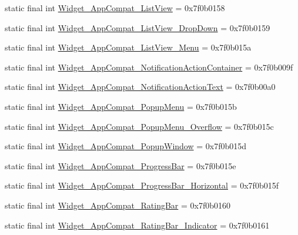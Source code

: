\begin{CompactItemize}
\item 
static final int \hyperlink{classandroid_1_1support_1_1v7_1_1appcompat_1_1_r_1_1style_bc4db4a3feb2a57a38527edc307ebd1e}{Widget\_\-AppCompat\_\-ListView} = 0x7f0b0158
\item 
static final int \hyperlink{classandroid_1_1support_1_1v7_1_1appcompat_1_1_r_1_1style_d32aefb5cb943ba1377d332a2763f876}{Widget\_\-AppCompat\_\-ListView\_\-DropDown} = 0x7f0b0159
\item 
static final int \hyperlink{classandroid_1_1support_1_1v7_1_1appcompat_1_1_r_1_1style_722848f3fc4262932efb8df368153506}{Widget\_\-AppCompat\_\-ListView\_\-Menu} = 0x7f0b015a
\item 
static final int \hyperlink{classandroid_1_1support_1_1v7_1_1appcompat_1_1_r_1_1style_c01243ba782a770cf99e6751ab28245a}{Widget\_\-AppCompat\_\-NotificationActionContainer} = 0x7f0b009f
\item 
static final int \hyperlink{classandroid_1_1support_1_1v7_1_1appcompat_1_1_r_1_1style_2c1a4b4918286c87dc1c2da681631eed}{Widget\_\-AppCompat\_\-NotificationActionText} = 0x7f0b00a0
\item 
static final int \hyperlink{classandroid_1_1support_1_1v7_1_1appcompat_1_1_r_1_1style_b962f807b6f37dc746f47a5c8bd0c9f5}{Widget\_\-AppCompat\_\-PopupMenu} = 0x7f0b015b
\item 
static final int \hyperlink{classandroid_1_1support_1_1v7_1_1appcompat_1_1_r_1_1style_2acc2be325d8d444e03f859ad894b5f3}{Widget\_\-AppCompat\_\-PopupMenu\_\-Overflow} = 0x7f0b015c
\item 
static final int \hyperlink{classandroid_1_1support_1_1v7_1_1appcompat_1_1_r_1_1style_febe558d21ac226c9e92352886e3ad97}{Widget\_\-AppCompat\_\-PopupWindow} = 0x7f0b015d
\item 
static final int \hyperlink{classandroid_1_1support_1_1v7_1_1appcompat_1_1_r_1_1style_b7997e0a61506e74d4f244b895807c64}{Widget\_\-AppCompat\_\-ProgressBar} = 0x7f0b015e
\item 
static final int \hyperlink{classandroid_1_1support_1_1v7_1_1appcompat_1_1_r_1_1style_70e128257d4f165ffacde6396cb748d6}{Widget\_\-AppCompat\_\-ProgressBar\_\-Horizontal} = 0x7f0b015f
\item 
static final int \hyperlink{classandroid_1_1support_1_1v7_1_1appcompat_1_1_r_1_1style_6a603c0194ac4a9b4c5e22fae3d6d6a1}{Widget\_\-AppCompat\_\-RatingBar} = 0x7f0b0160
\item 
static final int \hyperlink{classandroid_1_1support_1_1v7_1_1appcompat_1_1_r_1_1style_7c0972e23b11a038f92eb4528c1cdecf}{Widget\_\-AppCompat\_\-RatingBar\_\-Indicator} = 0x7f0b0161

\end{CompactItemize}
